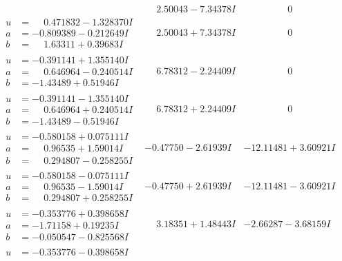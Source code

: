 \documentclass[1p]{elsarticle_modified}
\theoremstyle{definition}
\begin{document}
$$\begin{array}{c|c|c}
 & \phantom{-}2.50043 - 7.34378 I & \phantom{-0.000000 } 0 \\ \hline\begin{aligned}
u &= \phantom{-}0.471832 - 1.328370 I \\
a &= -0.809389 - 0.212649 I \\
b &= \phantom{-}1.63311 + 0.39683 I\end{aligned}
 & \phantom{-}2.50043 + 7.34378 I & \phantom{-0.000000 } 0 \\ \hline\begin{aligned}
u &= -0.391141 + 1.355140 I \\
a &= \phantom{-}0.646964 - 0.240514 I \\
b &= -1.43489 + 0.51946 I\end{aligned}
 & \phantom{-}6.78312 - 2.24409 I & \phantom{-0.000000 } 0 \\ \hline\begin{aligned}
u &= -0.391141 - 1.355140 I \\
a &= \phantom{-}0.646964 + 0.240514 I \\
b &= -1.43489 - 0.51946 I\end{aligned}
 & \phantom{-}6.78312 + 2.24409 I & \phantom{-0.000000 } 0 \\ \hline\begin{aligned}
u &= -0.580158 + 0.075111 I \\
a &= \phantom{-}0.96535 + 1.59014 I \\
b &= \phantom{-}0.294807 - 0.258255 I\end{aligned}
 & -0.47750 - 2.61939 I & -12.11481 + 3.60921 I \\ \hline\begin{aligned}
u &= -0.580158 - 0.075111 I \\
a &= \phantom{-}0.96535 - 1.59014 I \\
b &= \phantom{-}0.294807 + 0.258255 I\end{aligned}
 & -0.47750 + 2.61939 I & -12.11481 - 3.60921 I \\ \hline\begin{aligned}
u &= -0.353776 + 0.398658 I \\
a &= -1.71158 + 0.19235 I \\
b &= -0.050547 - 0.825568 I\end{aligned}
 & \phantom{-}3.18351 + 1.48443 I & -2.66287 - 3.68159 I \\ \hline\begin{aligned}
u &= -0.353776 - 0.398658 I \\

\end{aligned}
\end{array}$$
\end{document}
